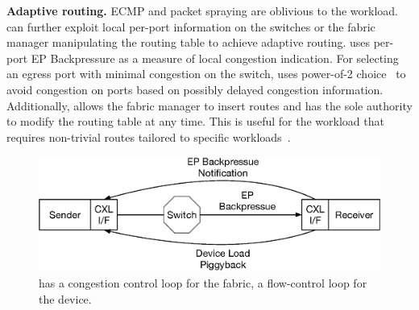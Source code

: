 \noindent \textbf{Adaptive routing.}
%
ECMP and packet spraying are oblivious to the workload. 
%
\aurelia can further exploit local per-port information on the switches or the fabric manager manipulating the routing table to achieve adaptive routing.
%
\aurelia uses per-port EP Backpressure as a measure of local congestion indication. 
%
For selecting an egress port with minimal congestion on the switch, \aurelia uses power-of-2 choice~\cite{power-of-two:tpds:2001} to avoid congestion on ports based on possibly delayed congestion information.
%
Additionally, \aurelia allows the fabric manager to insert routes and has the sole authority to modify the routing table at any time.
%
This is useful for the workload that requires non-trivial routes tailored to specific workloads~\cite{gullfoss:tech-report:2015, fractos:eurosys:2022}. 
%

\begin{figure}[ht!]
    \centering
    \includegraphics[width=0.9\columnwidth]{figure/aurelia/congestion-control-flow.eps}
    \caption{\aurelia has a congestion control loop for the fabric, a flow-control loop for the device.}
    \label{fig:congestion-control}
\end{figure}

